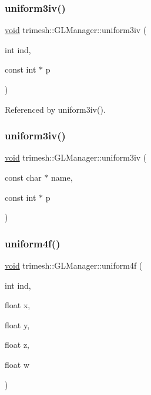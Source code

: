 \subsubsection{\texorpdfstring{uniform3iv()}{uniform3iv()}\hspace{0.1cm}{\footnotesize\ttfamily [1/2]}}
{\footnotesize\ttfamily \hyperlink{namespacetrimesh_a784ddfd979e1c579bda795a8edfc3f43}{void} trimesh\+::\+G\+L\+Manager\+::uniform3iv (\begin{DoxyParamCaption}\item[{int}]{ind,  }\item[{const int $\ast$}]{p }\end{DoxyParamCaption})\hspace{0.3cm}{\ttfamily [inline]}}



Referenced by uniform3iv().

\mbox{\label{classtrimesh_1_1GLManager_a1c405b9e0ecb9551308bc43a7142e5dc}} 
\subsubsection{\texorpdfstring{uniform3iv()}{uniform3iv()}\hspace{0.1cm}{\footnotesize\ttfamily [2/2]}}
{\footnotesize\ttfamily \hyperlink{namespacetrimesh_a784ddfd979e1c579bda795a8edfc3f43}{void} trimesh\+::\+G\+L\+Manager\+::uniform3iv (\begin{DoxyParamCaption}\item[{const char $\ast$}]{name,  }\item[{const int $\ast$}]{p }\end{DoxyParamCaption})\hspace{0.3cm}{\ttfamily [inline]}}

\mbox{\label{classtrimesh_1_1GLManager_a7895f5129d3031f7e4535d2520175636}} 
\subsubsection{\texorpdfstring{uniform4f()}{uniform4f()}\hspace{0.1cm}{\footnotesize\ttfamily [1/2]}}
{\footnotesize\ttfamily \hyperlink{namespacetrimesh_a784ddfd979e1c579bda795a8edfc3f43}{void} trimesh\+::\+G\+L\+Manager\+::uniform4f (\begin{DoxyParamCaption}\item[{int}]{ind,  }\item[{float}]{x,  }\item[{float}]{y,  }\item[{float}]{z,  }\item[{float}]{w }\end{DoxyParamCaption})}




